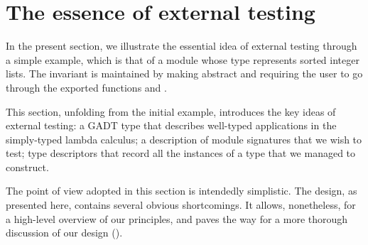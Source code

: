 \section{The essence of external testing}
\label{sec:essence}

In the present section, we illustrate the essential idea of external testing
through a simple example, which is that of a module  whose type
 represents sorted integer lists. The invariant is maintained by making
 abstract and requiring the user to go through the exported functions
 and .

This section, unfolding from the initial example, introduces the key ideas of
external testing: a GADT type that describes well-typed applications in the
simply-typed lambda calculus; a description of module signatures that we wish to
test; type descriptors that record all the instances of a type that we managed
to construct.

The point of view adopted in this section is intendedly simplistic. The design,
as presented here, contains several obvious shortcomings. It allows,
nonetheless, for a high-level overview of our principles, and paves the way for
a more thorough discussion of our design ().

